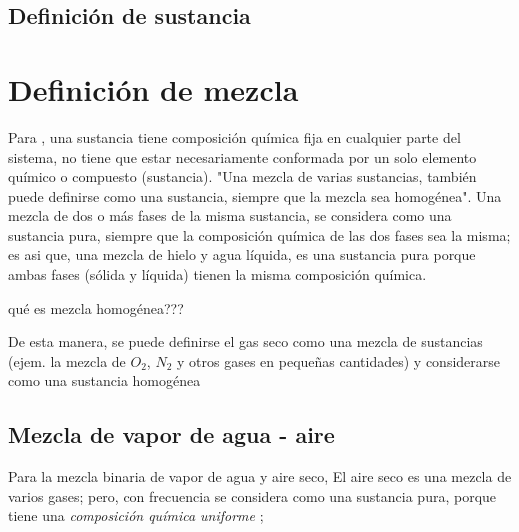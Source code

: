 \subsection{Definición de sustancia}

\section{Definición de mezcla}
    Para \cite{bib_termodinamica_cengel_2015}, una sustancia tiene composición química fija en cualquier parte del sistema, no tiene que estar necesariamente  conformada por un solo elemento químico o compuesto (sustancia). "Una mezcla de varias sustancias, también puede definirse como una sustancia, siempre que la mezcla sea homogénea". Una mezcla de dos o más fases de la misma sustancia, se considera como una sustancia pura, siempre que la composición química de las dos fases sea la misma; es asi que, una mezcla de hielo y agua líquida, es una sustancia pura porque ambas fases (sólida y líquida) tienen la misma composición química.

    qué es mezcla homogénea???

    De esta manera, se puede definirse el gas seco como una mezcla de sustancias (ejem. la mezcla de $O_2$, $N_2$ y otros gases en pequeñas cantidades) y considerarse como una sustancia homogénea

    \subsection{Mezcla de vapor de agua - aire}
        Para la mezcla binaria de vapor de agua y aire seco, 
        El aire seco es una mezcla de varios gases; pero, con frecuencia se considera como una sustancia pura, porque tiene una \textit{composición química uniforme} \parencite[p. 110]{bib_termodinamica_cengel_2015};
        
